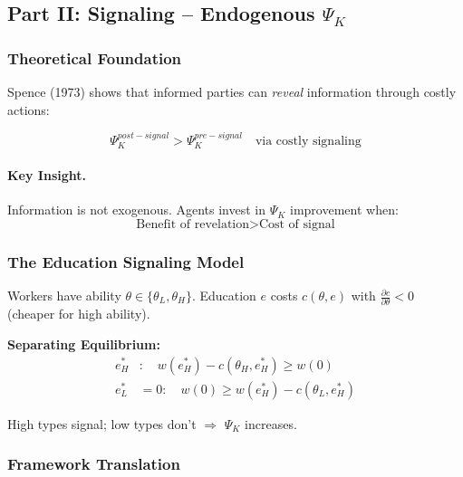 \subsection{Part II: Signaling – Endogenous $\Psi_K$}

\subsubsection{Theoretical Foundation}

Spence (1973) shows that informed parties can \textit{reveal} information through 
costly actions:

\begin{equation}
\boxed{
\Psi_K^{post-signal} > \Psi_K^{pre-signal} \quad \text{via costly signaling}
}
\label{eq:spence-signaling}
\end{equation}

\paragraph{Key Insight.}
Information is not exogenous. Agents invest in $\Psi_K$ improvement when:
\begin{equation}
\text{Benefit of revelation} > \text{Cost of signal}
\end{equation}

\subsubsection{The Education Signaling Model}

Workers have ability $\theta \in \{\theta_L, \theta_H\}$. Education $e$ costs $c(\theta, e)$
with $\frac{\partial c}{\partial \theta} < 0$ (cheaper for high ability).

\textbf{Separating Equilibrium:}
\begin{align}
e^*_H &: \quad w(e^*_H) - c(\theta_H, e^*_H) \geq w(0) \\
e^*_L &= 0 : \quad w(0) \geq w(e^*_H) - c(\theta_L, e^*_H)
\end{align}

High types signal; low types don't $\Rightarrow$ $\Psi_K$ increases.

\subsubsection{Framework Translation}


